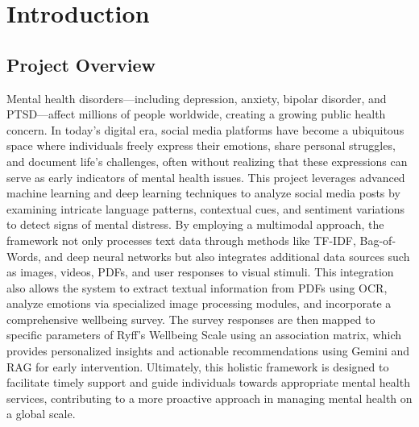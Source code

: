 
\section{Introduction}

\begin{comment}
    Briefly introduce the project's overall topic and purpose.
    \vspace{.1in}
    
    \noindent
    Provide specifications of Technical domain (Hardware, Operating System, Software) and Business domain.
    \vspace{.1in}
    
    \noindent
    Provide \textbf{Glossary} / Keywords in a tabular format.
\end{comment}


\subsection{Project Overview}
\vspace{.1in}
\noindent
Mental health disorders—including depression, anxiety, bipolar disorder, and PTSD—affect millions of people worldwide, creating a growing public health concern. In today’s digital era, social media platforms have become a ubiquitous space where individuals freely express their emotions, share personal struggles, and document life’s challenges, often without realizing that these expressions can serve as early indicators of mental health issues. This project leverages advanced machine learning and deep learning techniques to analyze social media posts by examining intricate language patterns, contextual cues, and sentiment variations to detect signs of mental distress. By employing a multimodal approach, the framework not only processes text data through methods like TF-IDF, Bag-of-Words, and deep neural networks but also integrates additional data sources such as images, videos, PDFs, and user responses to visual stimuli. This integration also allows the system to extract textual information from PDFs using OCR, analyze emotions via specialized image processing modules, and incorporate a comprehensive wellbeing survey. The survey responses are then mapped to specific parameters of Ryff’s Wellbeing Scale using an association matrix, which provides personalized insights and actionable recommendations using Gemini and RAG for early intervention. Ultimately, this holistic framework is designed to facilitate timely support and guide individuals towards appropriate mental health services, contributing to a more proactive approach in managing mental health on a global scale.

